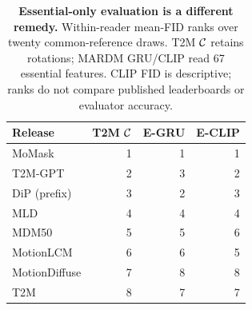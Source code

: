 \begin{table}[t]
\centering\footnotesize
\caption{\textbf{Essential-only evaluation is a different remedy.} Within-reader mean-FID ranks over twenty common-reference draws. T2M $\mathcal{C}$ retains rotations; MARDM GRU/CLIP read 67 essential features. CLIP FID is descriptive; ranks do not compare published leaderboards or evaluator accuracy.}\label{tab:mardmranks}
\begin{tabular}{@{}lrrr@{}}\toprule
Release&T2M $\mathcal{C}$&E-GRU&E-CLIP\\\midrule
MoMask&1&1&1\\
T2M-GPT&2&3&2\\
DiP (prefix)&3&2&3\\
MLD&4&4&4\\
MDM50&5&5&6\\
MotionLCM&6&6&5\\
MotionDiffuse&7&8&8\\
T2M&8&7&7\\
\bottomrule\end{tabular}\end{table}

